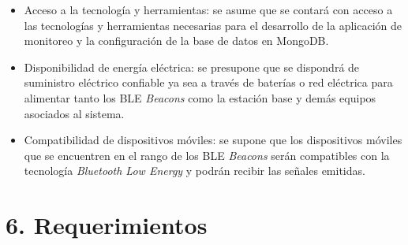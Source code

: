 \documentclass[
11pt, %
]{charter}
\begin{document}
\begin{itemize}
	\item Acceso a la tecnología y herramientas: se asume que se contará con acceso a las tecnologías y herramientas necesarias para el desarrollo de la aplicación de monitoreo y la configuración de la base de datos en MongoDB.
	\item Disponibilidad de energía eléctrica: se presupone que se dispondrá de suministro eléctrico confiable ya sea a través de baterías o red eléctrica para alimentar tanto los BLE \textit{Beacons} como la estación base y demás equipos asociados al sistema.
	\item Compatibilidad de dispositivos móviles: se supone que los dispositivos móviles que se encuentren en el rango de los BLE \textit{Beacons} serán compatibles con la tecnología \textit{Bluetooth Low Energy} y podrán recibir las señales emitidas. 
\end{itemize}

\section{6. Requerimientos}
\label{sec:requerimientos}
\end{document}
